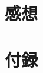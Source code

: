 \documentclass[a4j]{jarticle}
\begin{document}

\section{感想}


\newpage
\section*{付録}

\end{document}
